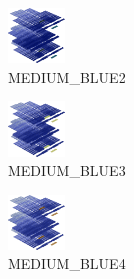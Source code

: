 \hspace{0.1cm}
\begin{minipage}[b]{0.15\linewidth}
\begin{figure}[H]                                                          
  \centering                                                             
  \begin{adjustbox}{width=1.5cm,center}                                   
  \includegraphics[width=1.5cm]{src/colorspace_colourflow/flows/colourflow_130-45.png}%
  \end{adjustbox}                                                        
\caption*{MEDIUM\_BLUE2}                                           
\end{figure}                                                               
\end{minipage}
\hspace{0.1cm}
\begin{minipage}[b]{0.15\linewidth}
\begin{figure}[H]                                                          
  \centering                                                             
  \begin{adjustbox}{width=1.5cm,center}                                   
  \includegraphics[width=1.5cm]{src/colorspace_colourflow/flows/colourflow_131-45.png}%
  \end{adjustbox}                                                        
\caption*{MEDIUM\_BLUE3}                                           
\end{figure}                                                               
\end{minipage}
\hspace{0.1cm}
\begin{minipage}[b]{0.15\linewidth}
\begin{figure}[H]                                                          
  \centering                                                             
  \begin{adjustbox}{width=1.5cm,center}                                   
  \includegraphics[width=1.5cm]{src/colorspace_colourflow/flows/colourflow_132-45.png}%
  \end{adjustbox}                                                        
\caption*{MEDIUM\_BLUE4}                                           
\end{figure}                                                               
\end{minipage}
